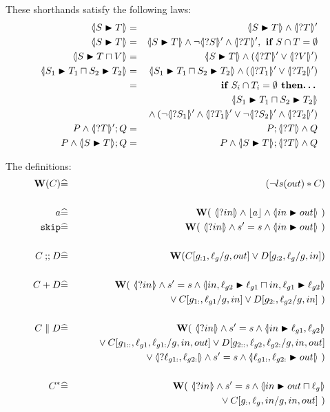 These  shorthands satisfy the following laws:
\begin{eqnarray*}
   \LUPD S T &=& \LUPD S T \land \LSd T
\\ \LUPD S T &=& \LUPD S T \land \lnot\LSd S \land \LSd T, \textbf{ if }S \cap T = \emptyset
\\ \LUPD S {T\ndc V} &=& \LUPD S T \land (\LSd T \lor \LSd V)
\\ \LNDC{S_1}{T_1}{S_2}{T_2}
   &=&
   \LNDC{S_1}{T_1}{S_2}{T_2}  \land (\LSd{T_1} \lor \LSd{T_2})
\\ &=& \textbf{ if }S_i \cap T_i = \emptyset \textbf{ then\ldots}
\\&& \LNDC{S_1}{T_1}{S_2}{T_2}  
\\&& {} \land (\lnot\LSd{S_1}\land\LSd{T_1} 
            \lor 
            \lnot\LSd{S_2}\land\LSd{T_2})
\\ P \land \LSd T ; Q
   &=&
   P ; \LS T \land Q
\\ P \land \LUPD S T ; Q
   &=&
   P \land \LUPD S T ; \LS T \land Q
\end{eqnarray*}

The definitions:
\begin{eqnarray*}
   \W(C) &\defs& (\lnot ls(out) * C)
\\
\\ a &\defs&\W(~\LS{in} \land \ado a \land \LUPD{in}{out}~)
\\ \cskip
   &\defs&
   \W(~\LS{in} \land \ss \land \LUPD{in}{out}~)
\\
\\ C \cseq D
   &\defs&
   \W(C[g_{:1},\ell_g/g,out] \lor D[g_{:2},\ell_g/g,in])
\\
\\ C + D
   &\defs&
   \W(~\LS{in}
   \land \ss
   \land \LNDC{in,\ell_{g2}}{\ell_{g1}}
                {in,\ell_{g1}}{\ell_{g2}}
\\ && \qquad {} \lor
   C[g_{1:},\ell_{g1}/g,in] \lor D[g_{2:},\ell_{g2}/g,in]~)
\\
\\ C \parallel D
   &\defs&
   \W(~\LS{in}
   \land \ss
   \land \LUPD{in}{\ell_{g1},\ell_{g2}}
\\ && \qquad {}\lor
   C[g_{1::},\ell_{g1},\ell_{g1:}/g,in,out]
   \lor D[g_{2::},\ell_{g2},\ell_{g2:}/g,in,out]
\\ && \qquad {}\lor
   \LS{\ell_{g1:},\ell_{g2:}}
   \land \ss
   \land \LUPD{\ell_{g1:},\ell_{g2:}}{out}~)
\\
\\ C^*
   &\defs&
   \W(~\LS{in}
   \land \ss
   \land \LUPD{in}{out \ndc \ell_g}
\\ && \qquad {}\lor
   C[g_{:},\ell_g,in/g,in,out]~)
\end{eqnarray*}


